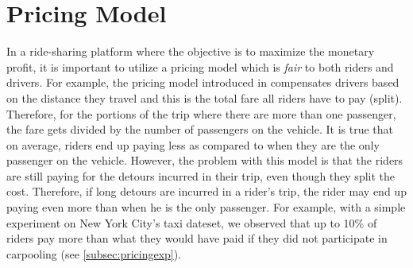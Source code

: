 \vspace{-3mm}
\section{Pricing Model}
\label{sec:pricing}


In a ride-sharing platform where the objective is to maximize the monetary profit, it is important to utilize a pricing model which is \textit{fair} to both riders and drivers. For example, the pricing model introduced in \cite{Ma13} compensates drivers based on the distance they travel and this is the total fare all riders have to pay (split). Therefore, for the portions of the trip where there are more than one passenger, the fare gets divided by the number of passengers on the vehicle. It is true that on average, riders end up paying less as compared to when they are the only passenger on the vehicle. However, the problem with this model is that the riders are still paying for the detours incurred in their trip, even though they split the cost. Therefore, if long detours are incurred in a rider's trip, the rider may end up paying even more than when he is the only passenger. For example, with a simple experiment on New York City's taxi dateset, we observed that up to 10\% of riders pay more than what they would have paid if they did not participate in carpooling (see \cref{subsec:pricingexp}).

